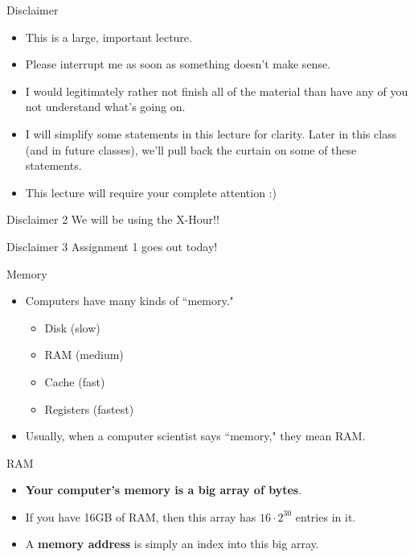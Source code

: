 \documentclass[hyphens,aspectratio=169,dvipsnames]{beamer}
\begin{document}
\begin{frame}[fragile]{Disclaimer}
    \begin{itemize}
        \pause \item This is a large, important lecture.
        \pause \item Please interrupt me as soon as something doesn't make sense.
        \pause \item I would legitimately rather not finish all of the material than have any of you not understand what's going on.
        \pause \item I will simplify some statements in this lecture for clarity. Later in this class (and in future classes), we'll pull back the curtain on some of these statements.
        \pause \item This lecture will require your complete attention :)
    \end{itemize}
\end{frame}

\begin{frame}[fragile]{Disclaimer 2}
    We will be using the X-Hour!!
\end{frame}

\begin{frame}[fragile]{Disclaimer 3}
    Assignment 1 goes out today!
\end{frame}

\begin{frame}[fragile]{Memory}
    \begin{itemize}
        \pause \item Computers have many kinds of ``memory."
        \begin{itemize}
            \pause \item Disk (slow)
            \pause \item RAM (medium)
            \pause \item Cache (fast)
            \pause \item Registers (fastest)
        \end{itemize}
        \pause \item Usually, when a computer scientist says ``memory," they mean RAM.
    \end{itemize}
\end{frame}

\begin{frame}[fragile]{RAM}
    \begin{itemize}
        \pause \item \textbf{Your computer's memory is a big array of bytes}.
        \pause \item If you have 16GB of RAM, then this array has $16 \cdot 2^{30}$ entries in it.
        \pause \item A \textbf{memory address} is simply an index into this big array.
    \end{itemize}
\end{frame}
\end{document}
